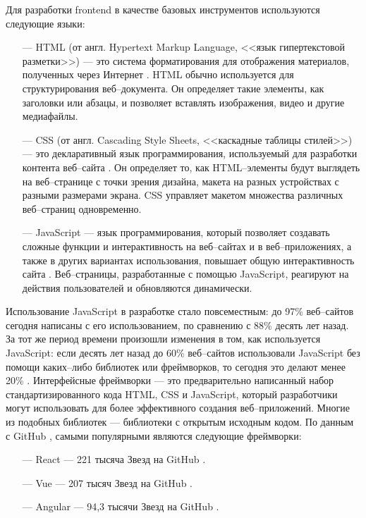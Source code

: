 Для разработки frontend в качестве базовых инструментов используются следующие языки: 

\begin{itemize}
	\item[---] HTML (от англ. Hypertext Markup Language,  <<язык гипертекстовой разметки>>) --- это система форматирования для отображения материалов, полученных через Интернет \cite{html}. 
	HTML обычно используется для структурирования веб--документа. Он определяет такие элементы, как заголовки или абзацы, и позволяет вставлять изображения, видео и другие медиафайлы.
	\item[---] CSS (от англ. Cascading Style Sheets,  <<каскадные таблицы стилей>>) --- это декларативный язык программирования, используемый для разработки контента веб--сайта \cite{css}. 
	Он определяет то, как HTML--элементы будут выглядеть на веб--странице с точки зрения дизайна, макета на разных устройствах с разными размерами экрана. 
	CSS управляет макетом множества различных веб--страниц одновременно.
	\item[---] JavaScript --- язык программирования, который позволяет создавать сложные функции и интерактивность на веб--сайтах и в веб--приложениях, а также в других вариантах использования, повышает общую интерактивность сайта \cite{js}. 
	Веб--страницы, разработанные с помощью JavaScript, реагируют на действия пользователей и обновляются динамически. %
\end{itemize}

Использование JavaScript в разработке стало повсеместным: до 97\% веб--сайтов сегодня написаны с его использованием, по сравнению с 88\% десять лет назад. 
За тот же период времени произошли изменения в том, как используется JavaScript: если десять лет назад до 60\% веб--сайтов использовали JavaScript без помощи каких--либо библиотек или фреймворков, то сегодня это делают менее 20\% \cite{сomparison}.
Интерфейсные фреймворки --- это предварительно написанный набор стандартизированного кода HTML, CSS и JavaScript, который разработчики могут использовать для более эффективного создания веб--приложений.
Многие из подобных библиотек --- библиотеки с открытым исходным кодом. По данным с GitHub \cite{github}, самыми популярными являются следующие фреймворки:

\begin{itemize}
	
	\item[---] React --- 221 тысяча Звезд на GitHub \cite{react-github}.
	\item[---] Vue ---  207 тысяч Звезд на GitHub \cite{vue-github}.
	\item[---] Angular --- 94,3 тысячи Звезд на GitHub \cite{angular-github}.
\end{itemize}
  
